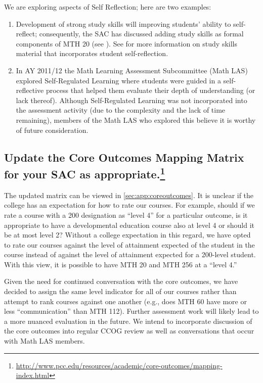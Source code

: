 \begin{description}
  We are exploring aspects of Self Reflection; here are two examples:
  \begin{enumerate}
    \item 
     Development of strong study skills will improving students' ability to self-reflect; consequently,  
      the SAC has discussed adding study skills as formal components
  of MTH 20 (see ).  See 
  for more information on study skills material that incorporates student
  self-reflection. 
\item 
  In AY 2011/12 the Math Learning Assessment Subcommittee (Math LAS) explored
  Self-Regulated Learning where students were guided in a self-reflective
  process that helped them evaluate their depth of understanding (or lack
  thereof).  Although Self-Regulated Learning was not incorporated into the
  assessment activity (due to the complexity and the lack of time remaining),
  members of the Math LAS who explored this believe it is worthy of future
  consideration.
  \end{enumerate}
\end{description}

\subsection[Core outcomes mapping matrix]{Update the Core Outcomes Mapping Matrix for your SAC as
appropriate.\footnote{\url{http://www.pcc.edu/resources/academic/core-outcomes/mapping-index.html}}}
The updated matrix can be viewed in \vref{sec:app:coreoutcomes}. 
It is unclear if the college has an expectation for how to rate our courses.
For example, should if we rate a course with a 200 designation as ``level 4'' for
a particular outcome, is it appropriate to have a developmental education
course also at level 4 or should it be at most level 2? Without a college
expectation in this regard, we have opted to rate our courses against the level
of attainment expected of the student in the course instead of against the
level of attainment expected for a 200-level student. With this view, it is
possible to have MTH 20 and MTH 256 at a ``level 4.'' 

Given the need for continued conversation with the core outcomes, we have
decided to assign the same level indicator for all of our courses rather than
attempt to rank courses against one another (e.g., does MTH 60 have more or less
``communication'' than MTH 112). Further assessment work will likely lead to a
more nuanced evaluation in the future. We intend to incorporate discussion of
the core outcomes into regular CCOG review as well as conversations that occur
with Math LAS members.

